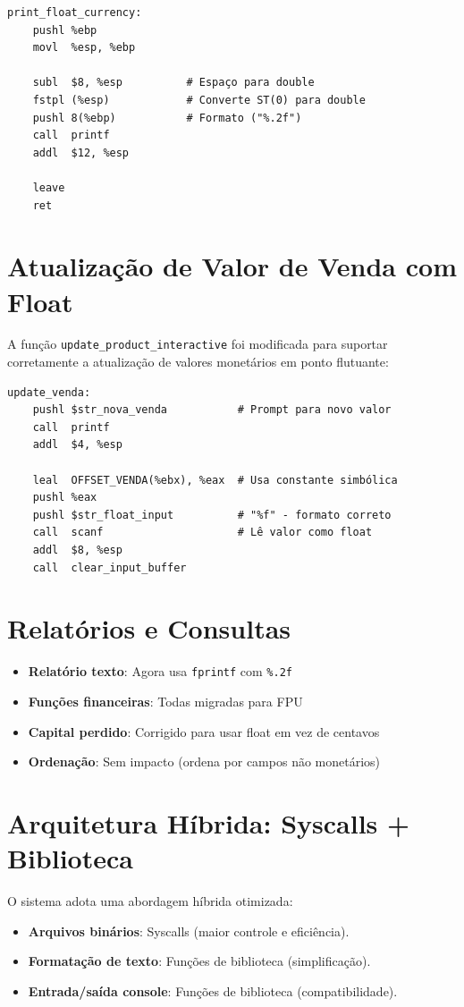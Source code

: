 \documentclass[12pt]{article}
\begin{document}
\begin{verbatim}
print_float_currency:
    pushl %ebp
    movl  %esp, %ebp
    
    subl  $8, %esp          # Espaço para double
    fstpl (%esp)            # Converte ST(0) para double
    pushl 8(%ebp)           # Formato ("%.2f")
    call  printf
    addl  $12, %esp
    
    leave
    ret
\end{verbatim}

\section{Atualização de Valor de Venda com Float}
A função \texttt{update\_product\_interactive} foi modificada para suportar corretamente a atualização de valores monetários em ponto flutuante:

\begin{verbatim}
update_venda:
    pushl $str_nova_venda           # Prompt para novo valor
    call  printf
    addl  $4, %esp
    
    leal  OFFSET_VENDA(%ebx), %eax  # Usa constante simbólica
    pushl %eax
    pushl $str_float_input          # "%f" - formato correto
    call  scanf                     # Lê valor como float
    addl  $8, %esp
    call  clear_input_buffer
\end{verbatim}

\section{Relatórios e Consultas}
\begin{itemize}
    \item \textbf{Relatório texto}: Agora usa \texttt{fprintf} com \texttt{\%.2f}
    \item \textbf{Funções financeiras}: Todas migradas para FPU
    \item \textbf{Capital perdido}: Corrigido para usar float em vez de centavos
    \item \textbf{Ordenação}: Sem impacto (ordena por campos não monetários)
\end{itemize}
\section{Arquitetura Híbrida: Syscalls + Biblioteca}

O sistema adota uma abordagem híbrida otimizada:

\begin{itemize}
    \item \textbf{Arquivos binários}: Syscalls (maior controle e eficiência).
    \item \textbf{Formatação de texto}: Funções de biblioteca (simplificação).
    \item \textbf{Entrada/saída console}: Funções de biblioteca (compatibilidade).
\end{itemize}
\end{document}
